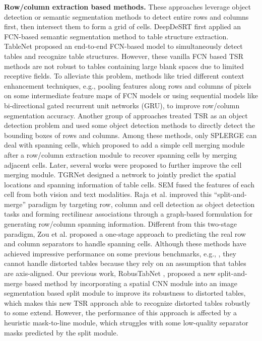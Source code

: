 \documentclass[sigconf]{acmart}
\begin{document}
\textbf{Row/column extraction based methods.} These approaches leverage object detection or semantic segmentation methods to detect entire rows and columns first, then intersect them to form a grid of cells. DeepDeSRT \cite{deepdesrt2017} first applied an FCN-based semantic segmentation method \cite{fcn2015} to table structure extraction. TableNet \cite{paliwal2019tablenet} proposed an end-to-end FCN-based model to simultaneously detect tables and recognize table structures. However, these vanilla FCN based TSR methods are not robust to tables containing large blank spaces due to limited receptive fields. To alleviate this problem, methods like \cite{rethinking2019,SPLERGE,khan2019table} tried different context enhancement techniques, e.g., pooling features along rows and columns of pixels on some intermediate feature maps of FCN models or using sequential models like bi-directional gated recurrent unit networks (GRU), to improve row/column segmentation accuracy. Another group of approaches \cite{deeptabstr2019,hashmi2021guided} treated TSR as an object detection problem and used some object detection methods to directly detect the bounding boxes of rows and columns. Among these methods, only SPLERGE \cite{SPLERGE} can deal with spanning cells, which proposed to add a simple cell merging module after a row/column extraction module to recover spanning cells by merging adjacent cells. Later, several works were proposed to further improve the cell merging module. TGRNet \cite{xue2021tgrnet} designed a network to jointly predict the spatial locations and spanning information of table cells. SEM \cite{zhang2022split} fused the features of each cell from both vision and text modalities. Raja et al. \cite{raja2022visual} improved this ``split-and-merge'' paradigm by targeting row, column and cell detection as object detection tasks and forming rectilinear associations through a graph-based formulation for generating row/column spanning information. Different from this two-stage paradigm, Zou et al. \cite{zou2020deep} proposed a one-stage approach to predicting the real row and column separators to handle spanning cells. Although these methods have achieved impressive performance on some previous benchmarks, e.g., \cite{gobel2013icdar,chi2019complicated,zhong2020image}, they cannot handle distorted tables because they rely on an assumption that tables are axis-aligned. Our previous work, RobusTabNet \cite{ma2022robust}, proposed a new split-and-merge based method by incorporating a spatial CNN module \cite{spatialcnn} into an image segmentation based split module to improve its robustness to distorted tables, which makes this new TSR approach able to recognize distorted tables robustly to some extend. However, the performance of this approach is affected by a heuristic mask-to-line module, which struggles with some low-quality separator masks predicted by the split module.
\end{document}
